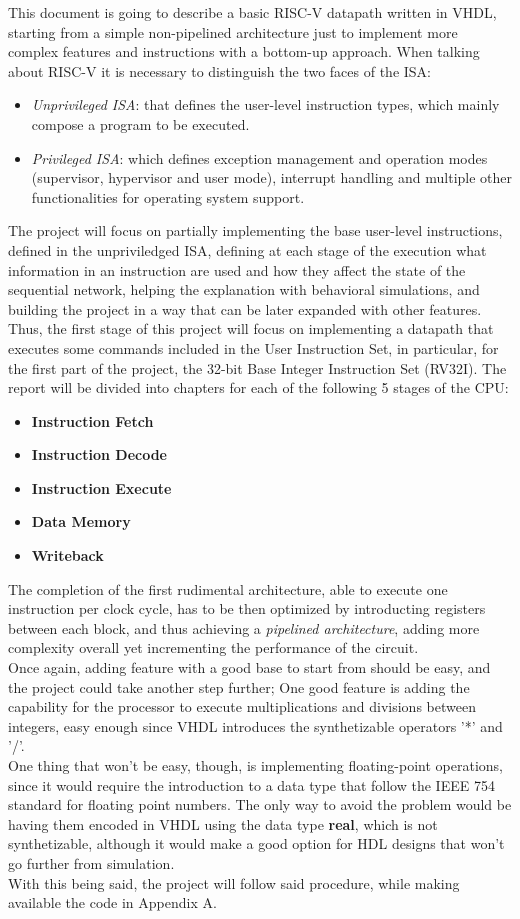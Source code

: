 This document is going to describe a basic RISC-V datapath written in VHDL, starting from a simple non-pipelined architecture just to implement more complex features and instructions with a bottom-up approach.
When talking about RISC-V it is necessary to distinguish the two faces of the ISA:
\begin{itemize}
    \item \emph{Unprivileged ISA}: that defines the user-level instruction types, which mainly compose a program to be executed.
    \item \emph{Privileged ISA}: which defines exception management and operation modes (supervisor, hypervisor and user mode), interrupt handling and multiple other functionalities for operating system support.
\end{itemize}
The project will focus on partially implementing the base user-level instructions, defined in the unpriviledged ISA, defining at each stage of the execution what information in an instruction are used and how they affect the state of the sequential network, helping the explanation with behavioral simulations, and building the project in a way that can be later expanded with other features.
Thus, the first stage of this project will focus on implementing a datapath that executes some commands included in the User Instruction Set, in particular, for the first part of the project, the 32-bit Base Integer Instruction Set (RV32I).
The report will be divided into chapters for each of the following 5 stages of the CPU:
\begin{itemize}
\item \textbf{Instruction Fetch}
\item \textbf{Instruction Decode} 
\item \textbf{Instruction Execute} 
\item \textbf{Data Memory}
\item \textbf{Writeback} 
\end{itemize}
The completion of the first rudimental architecture, able to execute one instruction per clock cycle, has to be then optimized by introducting registers between each block, and thus achieving a \emph{pipelined architecture}, adding more complexity overall yet incrementing the performance of the circuit.\\
Once again, adding feature with a good base to start from should be easy, and the project could take another step further; One good feature is adding the capability for the processor to execute multiplications and divisions between integers, easy enough since VHDL introduces the synthetizable operators '*' and '/'.\\
One thing that won't be easy, though, is implementing floating-point operations, since it would require the introduction to a data type that follow the IEEE 754 standard for floating point numbers. The only way to avoid the problem would be having them encoded in VHDL using the data type \textbf{real}, which is not synthetizable, although it would make a good option for HDL designs that won't go further from simulation.\\
With this being said, the project will follow said procedure, while making available the code in Appendix A.
